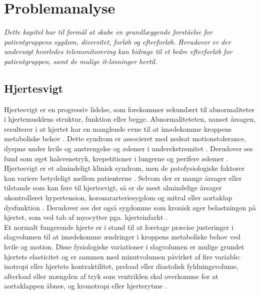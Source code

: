 \chapter{Problemanalyse}
\textit{Dette kapitel har til formål at skabe en grundlæggende forståelse for patientgruppens sygdom, diversitet, forløb og efterforløb. Herudover er der undersøgt hvorledes telemonitorering kan bidrage til et bedre efterforløb for patientgruppen, samt de mulige it-løsninger hertil.}

\section{Hjertesvigt} \label{hjertesvigt}

Hjertesvigt er en progressiv lidelse, som forekommer sekundært til abnormaliteter i hjertemusklens struktur, funktion eller begge. Abnormaliteteten, uanset årsagen, resulterer i at hjertet har en manglende evne til at imødekomme kroppens metaboliske behov \citep{Shah2011}\citep{Fletcher2001}\citep{Francis1998}\citep{Mudd2008}. Dette syndrom er associeret med nedsat motionstolerance, dyspnø under hvile og anstrengelse og ødemer i underekstremitet \citep{Francis1998}. Derudover ses fund som øget halsvenetryk, krepetitioner i lungerne og perifere ødemer \citep{heartfailure}.\\
Hjertesvigt er et almindeligt klinisk syndrom, men de patofysiologiske faktorer kan variere betydeligt mellem patienterne \citep{Parmley1985}. Selvom der er mange årsager eller tilstande som kan føre til hjertesvigt, så er de mest almindelige årsager ukontrolleret hypertension, koronararteriesygdom og mitral eller aortaklap dysfunktion \citep{Fletcher2001}. Derudover ses der også sygdomme som kronisk øger belastningen på hjertet, som ved tab af myocytter pga. hjerteinfarkt \citep{Shah2011}. \\
Et normalt fungerende hjerte er i stand til at foretage præcise justeringer i slagvolumen til at imødekomme ændringer i kroppens metaboliske behov ved hvile og motion. Disse fysiologiske variationer i slagvolumen er mulige grundet hjertets elasticitet og er sammen med minutvolumen påvirket af fire variable: inotropi eller hjertets kontraktilitet, preload eller diastolisk fyldningsvolume, afterload eller mængden af tryk som ventriklen skal overkomme for at aortaklappen åbnes, og kronotropi eller hjerterytme \citep{Fletcher2001}.  \\
